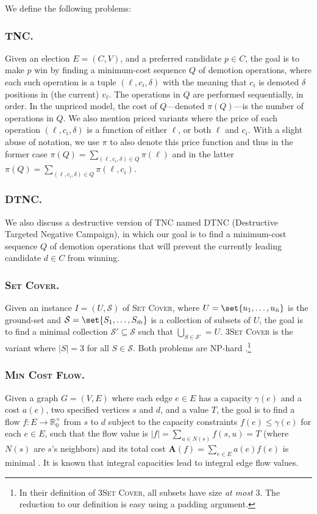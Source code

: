 \documentclass[letterpaper]{article} %
\newcommand{\preals}{\mathbb{R}^{+}_{0}}
\newcommand{\vecc}{\mathbf}
\newcommand{\CTSC}{\textsc{3Set Cover}}
\newcommand{\SC}{\textsc{Set Cover}}
\newcommand{\MCF}{\textsc{Min Cost Flow}}
\newcommand{\SB}{\textsc{TNC}}
\newcommand{\DTNC}{\textsc{DTNC}}
\newcommand{\abs}[1]{\lvert{#1}\rvert}
\newcommand{\Aoper}[1]{\vecc{A}({#1})}
\newcommand{\NP}{\mathrm{NP}}
\begin{document}
We define the following problems:
\subsubsection{\SB{}.} Given an election $E=(C,V)$, and a preferred candidate $p \in C$, the goal is to make $p$ win by finding a minimum-cost sequence $Q$ of demotion operations, where each such operation is a tuple $(\ell, c_i, \delta)$ with the meaning that $c_i$ is demoted $\delta$ positions in (the current) $v_\ell$. The operations in $Q$ are performed sequentially, in order. In the unpriced model, the cost of $Q$---denoted $\pi(Q)$---is the number of operations in $Q$. We also mention priced variants where the price of each operation $(\ell, c_i, \delta)$  is a function of either $\ell$, or both $\ell$ and $c_i$. With a slight abuse of notation, we use $\pi$ to also denote this price function and thus  in the former case $\pi(Q)=\sum_{(\ell, c_i, \delta) \in Q}\pi(\ell)$ and in the latter  $\pi(Q)=\sum_{(\ell, c_i, \delta) \in Q}\pi(\ell, c_i)$.

\subsubsection{\DTNC{}.} %
We also discuss a destructive version of \SB{} named \DTNC{} (Destructive Targeted Negative Campaign), in which our goal is to find a minimum-cost sequence $Q$ of demotion operations that will prevent the currently leading candidate $d \in C$ from winning.

\subsubsection{\SC{}.} Given an instance $I=(U,\mathcal{S})$ of \SC,  where $U=\set{u_1,\ldots,u_{\bar{n}}}$ is the ground-set and $\mathcal{S}=\set{S_1,\ldots,S_{\bar{m}}}$ is a collection of subsets of $U$,  the  goal is to find a minimal collection $\mathcal{S}' \subseteq \mathcal{S}$ such that $\bigcup_{S \in \mathcal{S}'} = U$. \CTSC{} is the variant where $\abs{S} = 3$ for all $S \in \mathcal{S}$. Both problems are $\NP$-hard \cite{garey1979computers}.\footnote{In their definition of \CTSC{}, all subsets have size \emph{at most} $3$. The reduction to our definition is easy using a padding argument.}
\subsubsection{\MCF{}.} Given a graph $G=(V,E)$ where each edge $e \in E$ has  a capacity $\gamma(e)$ and a cost $a(e)$, two specified vertices $s$ and $d$, and a value $T$, the goal is to find a flow $f\colon E \to \preals$ from $s$ to $d$ subject to the capacity constraints $f(e) \leq \gamma(e)$ for each $e \in E$, such that the flow value is $\abs{f} =\sum_{u \in  N(s)}f(s,u) = T$ (where $N(s)$ are $s$'s neighbors) and its total cost $\Aoper{f} = \sum_{e \in E}a(e)f(e)$ is minimal \cite{edmonds1972theoretical}. It is known that integral capacities lead to integral  edge flow values.
\end{document}
